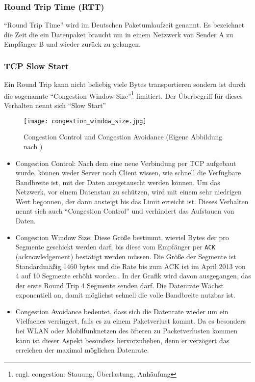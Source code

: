 
		\subsubsection{Round Trip Time (RTT)} %
		\label{ssub:rtt}
			"`Round Trip Time"' wird im Deutschen Paketumlaufzeit genannt. Es bezeichnet die Zeit die ein Datenpaket braucht um in einem Netzwerk von Sender A zu Empfänger B und wieder zurück zu gelangen.

		\subsubsection{TCP Slow Start} %
		\label{ssub:tcp_slow_start}

			Ein Round Trip kann nicht beliebig viele Bytes transportieren sondern ist durch die sogenannte "`Congestion Window Size"'\footnote{engl. congestion: Stauung, Überlastung, Anhäufung} limitiert. Der Überbegriff für dieses Verhalten nennt sich "`Slow Start"'

			\begin{figure}[htbp]
				\begin{center}
					\texttt{[image: congestion\_window\_size.jpg]}
					\caption{Congestion Control und Congestion Avoidance (Eigene Abbildung nach \autocite{grigorikSlowStart})}
					\label{fig:congestion_window_size}
				\end{center}
			\end{figure} 

			\begin{itemize}
				\item Congestion Control: Nach dem eine neue Verbindung per TCP aufgebaut wurde, können weder Server noch Client wissen, wie schnell die Verfügbare Bandbreite ist, mit der Daten ausgetauscht werden können. Um das Netzwerk, vor einem Datenstau zu schützen, wird mit einem sehr niedrigen Wert begonnen, der dann ansteigt bis das Limit erreicht ist. Dieses Verhalten nennt sich auch "`Congestion Control"' und verhindert das Aufstauen von Daten.
				\item Congestion Window Size: Diese Größe bestimmt, wieviel Bytes der pro Segmente geschickt werden darf, bis diese vom Empfänger per \texttt{ACK} (acknowledgement) bestätigt werden müssen. Die Größe der Segmente ist Standardmäßig 1460 bytes und die Rate bis zum ACK ist im April 2013 von 4 auf 10 Segmente erhöht worden.\autocite{grigorikSlowStart}. In der Grafik wird davon ausgegangen, das der erste Round Trip 4 Segmente senden darf. Die Datenrate Wächst exponentiell an, damit möglichst schnell die volle Bandbreite nutzbar ist.\\
				\item Congestion Avoidance bedeutet, dass sich die Datenrate wieder um ein Vielfaches verringert, falls es zu einem Paketverlust kommt. Da es besonders bei WLAN oder Mobilfunknetzen des öfteren zu Packetverlusten kommen kann ist dieser Aspekt besonders hervorzuheben, denn er verzögert das erreichen der maximal möglichen Datenrate.
			\end{itemize}

